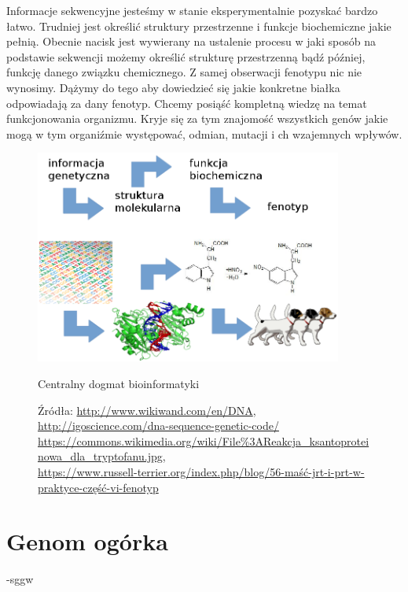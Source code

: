 Informacje sekwencyjne jesteśmy w stanie eksperymentalnie pozyskać bardzo łatwo. Trudniej jest określić struktury przestrzenne i funkcje biochemiczne jakie pełnią.
Obecnie nacisk jest wywierany na ustalenie procesu w jaki sposób na podstawie sekwencji możemy określić strukturę przestrzenną bądź później, funkcję danego związku chemicznego.
Z samej obserwacji fenotypu nic nie wynosimy. Dążymy do tego aby dowiedzieć się jakie konkretne białka odpowiadają za dany fenotyp. Chcemy posiąść kompletną wiedzę na temat funkcjonowania organizmu. Kryje się za tym znajomość wszystkich genów jakie mogą w tym organiźmie występować, odmian, mutacji i ch wzajemnych wpływów.

\begin{figure}[h]
	\centering
	\includegraphics[width=0.9\textwidth]{img/centralny-dogmat.png}
	\caption{Centralny dogmat bioinformatyki}
	\vspace{-0.5cm}
	\caption*{\scriptsize Źródła: 
		\url{http://www.wikiwand.com/en/DNA},
		\url{http://igoscience.com/dna-sequence-genetic-code/} \\
		\url{https://commons.wikimedia.org/wiki/File\%3AReakcja\_ksantoproteinowa\_dla\_tryptofanu.jpg}, \\
		\url{https://www.russell-terrier.org/index.php/blog/56-maść-jrt-i-prt-w-praktyce-część-vi-fenotyp}
	}
	\label{img:centralny-dogmat}
\end{figure}



\section{Genom ogórka}
-sggw
